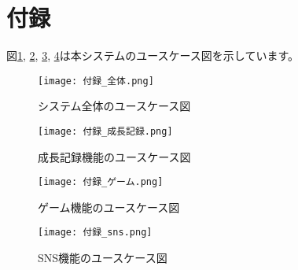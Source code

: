 \documentclass[a4j]{jarticle}
\begin{document}
\appendix
\section{付録}
図\ref{全体}, \ref{成長記録}, \ref{ゲーム}, \ref{SNS}は本システムのユースケース図を示しています。

\begin{figure}[h]
  \begin{center}
    \texttt{[image: 付録\_全体.png]}
    \caption{システム全体のユースケース図}
    \label{全体}
  \end{center}
\end{figure}

\begin{figure}[h]
  \begin{center}
    \texttt{[image: 付録\_成長記録.png]}
    \caption{成長記録機能のユースケース図}
    \label{成長記録}
  \end{center}
\end{figure}

\begin{figure}[h]
  \begin{center}
    \texttt{[image: 付録\_ゲーム.png]}
    \caption{ゲーム機能のユースケース図}
    \label{ゲーム}
  \end{center}
\end{figure}

\begin{figure}[h]
  \begin{center}
    \texttt{[image: 付録\_sns.png]}
    \caption{SNS機能のユースケース図}
    \label{SNS}
  \end{center}
\end{figure}
\end{document}
